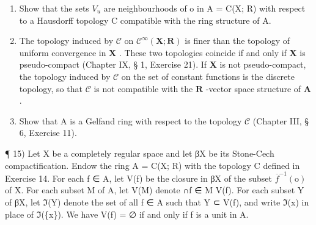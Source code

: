 \begin{enumerate}
\def\labelenumi{\alph{enumi})}
\item
  Show that the sets \(V_{u}\) are neighbourhoods of o in A = C(X; R) with respect to a Hausdorff topology C compatible with the ring structure of A.
\item
  The topology induced by \(\mathcal{C}\) on \(\mathcal{C}^{\infty}(\mathbf{X};\mathbf{R})\) is finer than the topology of uniform convergence in \(\mathbf{X}\) . These two topologies coincide if and only if \(\mathbf{X}\) is pseudo-compact (Chapter IX, § 1, Exercise 21). If \(\mathbf{X}\) is not pseudo-compact, the topology induced by \(\mathcal{C}\) on the set of constant functions is the discrete topology, so that \(\mathcal{C}\) is not compatible with the \(\mathbf{R}\) -vector space structure of \(\mathbf{A}\) .
\item
  Show that A is a Gelfand ring with respect to the topology \(\mathcal{C}\) (Chapter III, § 6, Exercise 11).
\end{enumerate}

¶ 15) Let X be a completely regular space and let βX be its Stone-Cech compactification. Endow the ring A = C(X; R) with the topology C defined in Exercise 14. For each f ∈ A, let V(f) be the closure in βX of the subset \(\overline{f}^{-1}(\mathrm{o})\) of X. For each subset M of A, let V(M) denote ∩f ∈ M V(f). For each subset Y of βX, let ℑ(Y) denote the set of all f ∈ A such that Y ⊂ V(f), and write ℑ(x) in place of ℑ(\{x\}). We have V(f) = ∅ if and only if f is a unit in A.

